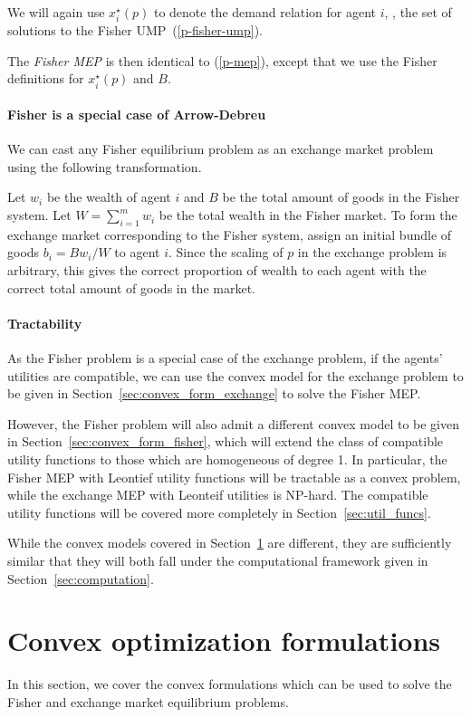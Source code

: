 \documentclass[12pt]{article}
\begin{document}
We will again use $x^\star_i(p)$ to denote the demand relation
for agent $i$, \ie, the set of solutions to the Fisher UMP~(\ref{p-fisher-ump}).

The \emph{Fisher MEP} is then identical to (\ref{p-mep}), except that we use 
the Fisher definitions for $x^\star_i(p)$ and $B$.

\paragraph{Fisher is a special case of Arrow-Debreu}
We can cast any Fisher equilibrium problem as an exchange market problem using the following transformation.

Let $w_i$ be the wealth of agent $i$ and $B$ be the total amount of goods in
the Fisher system.
Let $W = \sum_{i=1}^m w_i$ be the total wealth in the Fisher market.
To form the exchange market corresponding to the Fisher system, assign an initial bundle of goods
$b_i = B w_i/W$ to agent $i$.
Since the scaling of $p$ in the exchange problem is arbitrary,
this gives the correct proportion of wealth to each agent with the correct
total amount of goods in the market.


\paragraph{Tractability}
As the Fisher problem is a special case of the exchange problem,
if the agents' utilities are compatible, we can use the convex model for the
exchange problem
to be given in Section~\ref{sec:convex_form_exchange} to solve
the Fisher MEP.

However, the Fisher problem will also admit a different
convex model to be given in Section~\ref{sec:convex_form_fisher},
which will extend the class of compatible utility functions
to those which are homogeneous of degree 1.
In particular, the Fisher MEP with Leontief utility functions
will be tractable as a convex problem, while the exchange MEP
with Leonteif utilities is NP-hard.
The compatible utility functions will be covered more completely
in Section~\ref{sec:util_funcs}.

While the convex models covered in Section~\ref{sec:convex_form} are different,
they are sufficiently similar that they will both fall under the computational
framework given in Section~\ref{sec:computation}.


\section{Convex optimization formulations}
\label{sec:convex_form}
In this section, we cover the convex formulations which can be used to solve
the Fisher and exchange market equilibrium problems.
\end{document}
